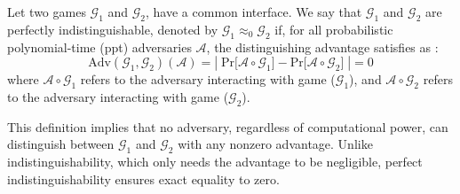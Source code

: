 %
\begin{definition}
	Let two games $\mathcal{G}_1$ and $\mathcal{G}_2$, have a common interface.
  We say that $\mathcal{G}_1$ and $\mathcal{G}_2$ are perfectly indistinguishable, denoted by 
  $\mathcal{G}_1\approx_0\mathcal{G}_2$ if, 
  for all probabilistic polynomial-time (ppt) adversaries $\mathcal{A}$,
  the distinguishing advantage satisfies as :
  $$\text{Adv} (\mathcal{G}_1, \mathcal{G}_2) (\mathcal{A}) 
  = |\;\text{Pr}\big[\mathcal{A}\circ\mathcal{G}_{1}\big]-\text{Pr}\big[\mathcal{A}\circ\mathcal{G}_{2}\big]\;| = 0 $$
  where $\mathcal{A}\circ\mathcal{G}_1$ refers to the adversary 
  interacting with \real game ($\mathcal{G}_{1}$), 
  and 
  $\mathcal{A}\circ\mathcal{G}_2$ refers to the adversary 
  interacting with \ideal game ($\mathcal{G}_{2}$).
\end{definition}
%
This definition implies that no adversary, regardless of computational power, 
can distinguish between $\mathcal{G}_{1}$ and $\mathcal{G}_{2}$ with any nonzero advantage. 
%
Unlike indistinguishability, which only needs the advantage to be 
negligible, perfect indistinguishability ensures exact equality to zero. 
%
%
%

%
%
%

